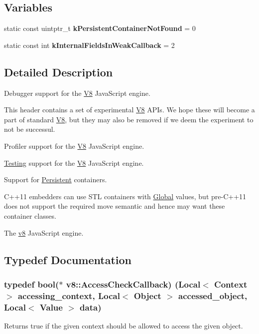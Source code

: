 \subsection*{Variables}
\begin{DoxyCompactItemize}
\item 
static const uintptr\+\_\+t {\bfseries k\+Persistent\+Container\+Not\+Found} = 0\hypertarget{namespacev8_add16ea53cb868b1828b3ef25264b897c}{}\label{namespacev8_add16ea53cb868b1828b3ef25264b897c}

\item 
static const int {\bfseries k\+Internal\+Fields\+In\+Weak\+Callback} = 2\hypertarget{namespacev8_a4dcca33d637c0aa7b2ca99fc6f934121}{}\label{namespacev8_a4dcca33d637c0aa7b2ca99fc6f934121}

\end{DoxyCompactItemize}


\subsection{Detailed Description}
Debugger support for the \hyperlink{classv8_1_1_v8}{V8} Java\+Script engine.

This header contains a set of experimental \hyperlink{classv8_1_1_v8}{V8} A\+P\+Is. We hope these will become a part of standard \hyperlink{classv8_1_1_v8}{V8}, but they may also be removed if we deem the experiment to not be successul.

Profiler support for the \hyperlink{classv8_1_1_v8}{V8} Java\+Script engine.

\hyperlink{classv8_1_1_testing}{Testing} support for the \hyperlink{classv8_1_1_v8}{V8} Java\+Script engine.

Support for \hyperlink{classv8_1_1_persistent}{Persistent} containers.

C++11 embedders can use S\+TL containers with \hyperlink{classv8_1_1_global}{Global} values, but pre-\/\+C++11 does not support the required move semantic and hence may want these container classes.

The \hyperlink{namespacev8}{v8} Java\+Script engine. 

\subsection{Typedef Documentation}
\subsubsection[{\texorpdfstring{Access\+Check\+Callback}{AccessCheckCallback}}]{\setlength{\rightskip}{0pt plus 5cm}typedef bool($\ast$ v8\+::\+Access\+Check\+Callback) ({\bf Local}$<$ {\bf Context} $>$ accessing\+\_\+context, {\bf Local}$<$ {\bf Object} $>$ accessed\+\_\+object, {\bf Local}$<$ {\bf Value} $>$ data)}\hypertarget{namespacev8_a1024fb358d107c1494163217830688e6}{}\label{namespacev8_a1024fb358d107c1494163217830688e6}
Returns true if the given context should be allowed to access the given object. 
